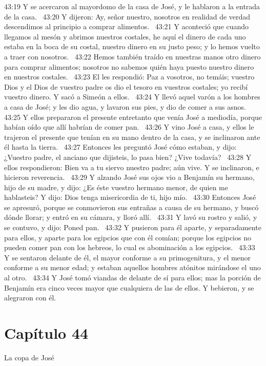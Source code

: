 43:19 Y se acercaron al mayordomo de la casa de José, y le hablaron a la entrada de la casa.  
43:20 Y dijeron: Ay, señor nuestro, nosotros en realidad de verdad descendimos al principio a comprar alimentos.  
43:21 Y aconteció que cuando llegamos al mesón y abrimos nuestros costales, he aquí el dinero de cada uno estaba en la boca de su costal, nuestro dinero en su justo peso; y lo hemos vuelto a traer con nosotros.  
43:22 Hemos también traído en nuestras manos otro dinero para comprar alimentos; nosotros no sabemos quién haya puesto nuestro dinero en nuestros costales.  
43:23 El les respondió: Paz a vosotros, no temáis; vuestro Dios y el Dios de vuestro padre os dio el tesoro en vuestros costales; yo recibí vuestro dinero. Y sacó a Simeón a ellos.  
43:24 Y llevó aquel varón a los hombres a casa de José; y les dio agua, y lavaron sus pies, y dio de comer a sus asnos.  
43:25 Y ellos prepararon el presente entretanto que venía José a mediodía, porque habían oído que allí habrían de comer pan.  
43:26 Y vino José a casa, y ellos le trajeron el presente que tenían en su mano dentro de la casa, y se inclinaron ante él hasta la tierra.  
43:27 Entonces les preguntó José cómo estaban, y dijo: ¿Vuestro padre, el anciano que dijisteis, lo pasa bien? ¿Vive todavía?  
43:28 Y ellos respondieron: Bien va a tu siervo nuestro padre; aún vive. Y se inclinaron, e hicieron reverencia.  
43:29 Y alzando José sus ojos vio a Benjamín su hermano, hijo de su madre, y dijo: ¿Es éste vuestro hermano menor, de quien me hablasteis? Y dijo: Dios tenga misericordia de ti, hijo mío.  
43:30 Entonces José se apresuró, porque se conmovieron sus entrañas a causa de su hermano, y buscó dónde llorar; y entró en su cámara, y lloró allí.  
43:31 Y lavó su rostro y salió, y se contuvo, y dijo: Poned pan.  
43:32 Y pusieron para él aparte, y separadamente para ellos, y aparte para los egipcios que con él comían; porque los egipcios no pueden comer pan con los hebreos, lo cual es abominación a los egipcios.  
43:33 Y se sentaron delante de él, el mayor conforme a su primogenitura, y el menor conforme a su menor edad; y estaban aquellos hombres atónitos mirándose el uno al otro.  
43:34 Y José tomó viandas de delante de sí para ellos; mas la porción de Benjamín era cinco veces mayor que cualquiera de las de ellos. Y bebieron, y se alegraron con él.  
\section*{Capítulo 44}
La copa de José 

